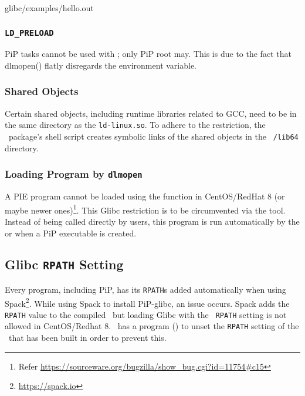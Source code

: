  {glibc/examples/hello.out}

\subsubsection{{\tt LD_PRELOAD}}

PiP tasks cannot be used with ; only PiP root
may. This is due to the fact that dlmopen() flatly disregards the
 environment variable.

\subsubsection{Shared Objects}

Certain shared objects, including runtime libraries related to GCC,
need to be in the same directory as the {\tt ld-linux.so}. To adhere
to the  restriction, the \pipglibc\ package's  shell
script creates symbolic links of the shared objects in the {\tt
  /lib64} directory. 

\subsubsection{Loading Program by {\tt dlmopen}}

A PIE program cannot be loaded using the  function
in CentOS/RedHat 8 (or maybe newer ones)\footnote{Refer
\url{https://sourceware.org/bugzilla/show_bug.cgi?id=11754\#c15}}. This
Glibc restriction is to be circumvented via the 
tool. Instead of being called directly by users, this program is run
automatically by the  or  when a PiP
executable is created. 

\subsection{Glibc {\tt RPATH} Setting}

Every program, including PiP, has its {\tt RPATH}s added automatically
when using Spack\footnote{\url{https://spack.io}}. While using Spack
to install PiP-glibc, an issue occurs. Spack adds the {\tt RPATH}
value to the compiled \pipglibc\, but loading Glibc with the {\tt
  RPATH} setting is not allowed in CentOS/Redhat 8. \pipglibc\ has a
program () to unset the {\tt RPATH} setting of the
\pipglibc\ that has been built in order to prevent this. 


